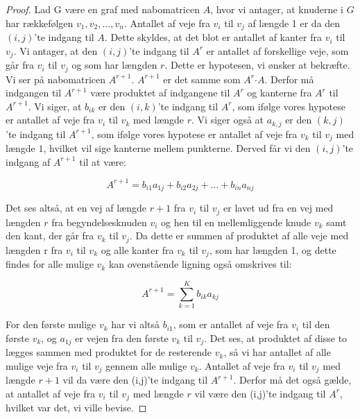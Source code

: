 \begin{proof}
Lad G være en graf med nabomatricen 
\textbf{$A$}, hvor vi antager, at knuderne i $G$ har rækkefølgen $v_{1},v_{2},\dotsc,v_{n}$. Antallet af veje fra $v_{i}$ til $v_{j}$ af længde 1 er da den $(i,j)$'te indgang til 
\textbf{$A$}. Dette skyldes, at det blot er antallet af kanter fra $v_{i}$ til $v_{j}$.
Vi antager, at den $(i,j)$'te indgang til 
\textbf{${A^r}$} er antallet af forskellige veje, som går fra $v_{i}$ til $v_{j}$ og som har længden $r$. Dette er hypotesen, vi ønsker at bekræfte.
Vi ser på nabomatricen \textbf{$A^{r+1}$}. 
\textbf{$A^{r+1}$} er det samme som 
\textbf{$A^{r}$}$\cdot$\textbf{$A$}. Derfor må indgangen til \textbf{$A^{r+1}$} være produktet af indgangene til \textbf{$A^{r}$} og kanterne fra \textbf{$A^{r}$} til \textbf{$A^{r+1}$}. Vi siger, at $b_{ik}$ er den $(i,k)$'te indgang til 
\textbf{$A^{r}$}, som ifølge vores hypotese er antallet af veje fra $v_{i}$ til $v_{k}$ med længde $r$. Vi siger også at $a_{k,j}$ er den $(k,j)$'te indgang til 
\textbf{$A^{r+1}$}, som ifølge vores hypotese er antallet af veje fra $v_{k}$ til $v_{j}$ med længde $1$, hvilket vil sige kanterne mellem punkterne. Derved får vi den $(i,j)$'te indgang af \textbf{$A^{r+1}$} til at være: 

\begin{equation*}
A^{r+1}=b_{i1}a_{1j} + b_{i2}a_{2j} +\dotsc+ b_{in}a_{nj}
\end{equation*}

Det ses altså, at en vej af længde $r + 1$ fra $v_{i}$ til $v_{j}$ er lavet ud fra en vej med længden $r$ fra begyndelsesknuden $v_{i}$ og hen til en mellemliggende knude $v_{k}$ samt den kant, der går fra $v_{k}$ til $v_{j}$. 
Da dette er summen af produktet af alle veje med længden r fra $v_{i}$ til $v_{k}$ og alle kanter fra $v_{k}$ til $v_{j}$, som har længden 1, og dette findes for alle mulige $v_{k}$ kan ovenstående ligning også omskrives til: 

\begin{equation*}
A^{r+1}=\sum_{k=1}^{K} b_{ik} a_{kj}
\end{equation*}

For den første mulige $v_{k}$ har vi altså $b_{i1}$, som er antallet af veje fra $v_{i}$ til den første $v_{k}$, og $a_{1j}$ er vejen fra den første $v_{k}$ til $v_{j}$. Det ses, at produktet af disse to lægges sammen med produktet for de resterende $v_{k}$, så vi har antallet af alle mulige veje fra $v_{i}$ til $v_{j}$ gennem alle mulige $v_{k}$. Antallet af veje fra $v_{i}$ til $v_{j}$ med længde $r+1$ vil da være den (i,j)'te indgang til $A^{r+1}$. Derfor må det også gælde, at antallet af veje fra $v_{i}$ til $v_{j}$ med længde $r$ vil være den (i,j)'te indgang til $A^{r}$, hvilket var det, vi ville bevise.

\end{proof}

